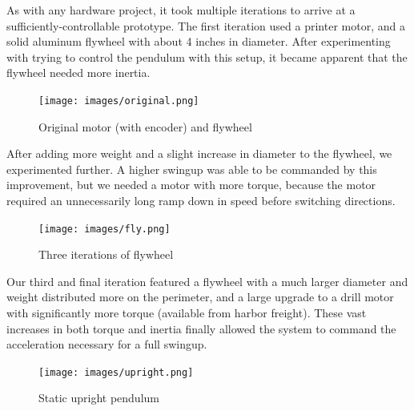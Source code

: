 \documentclass[conference]{IEEEtran}
\begin{document}

As with any hardware project, it
took multiple iterations to arrive at a sufficiently-controllable prototype. The
first iteration used a printer motor, and a solid aluminum flywheel with about 4
inches in diameter.  After experimenting with trying to control the pendulum
with this setup, it became apparent that the flywheel needed more inertia.

\begin{figure}[h]
    \centering
    \texttt{[image: images/original.png]}
    \caption{Original motor (with encoder) and flywheel}
    \label{original}
\end{figure}

After adding more weight and a slight increase in diameter to the
flywheel, we experimented further. A higher swingup was able to be commanded by
this improvement, but we needed a motor with more torque, because the motor
required an unnecessarily long ramp down in speed before switching directions.

\begin{figure}[h]
    \centering
    \texttt{[image: images/fly.png]}
    \caption{Three iterations of flywheel}
    \label{fly}
\end{figure}

Our third and final iteration featured a flywheel with a much larger
diameter and weight distributed more on the perimeter, and a large upgrade to a
drill motor with significantly more torque (available from harbor freight).
These vast increases in both torque and inertia finally allowed the system to
command the acceleration necessary for a full swingup.

\begin{figure}[h]
    \centering
    \texttt{[image: images/upright.png]}
    \caption{Static upright pendulum}
    \label{upright}
\end{figure}
    


\end{document}
